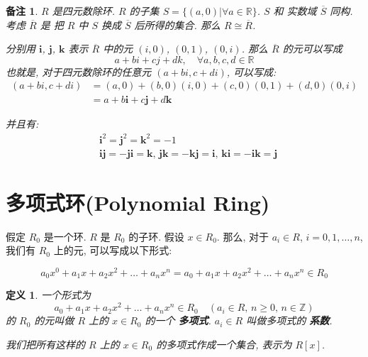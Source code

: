 \documentclass[utf8]{ctexbook}
\newtheorem{definition}{定义}[section]
\newtheorem{memo}{备注}[section]
\begin{document}
\begin{memo}
$R$ 是四元数除环. $R$ 的子集 $S = \{ (a, 0) | \forall a \in \mathbb{R} \}$. $S$ 和 实数域 $\overline{S}$ 同构. 考虑 $\overline{R}$ 是 把 $R$ 中 $S$ 换成 $\overline{S}$ 后所得的集合. 那么 $R \cong \overline{R}$. 

分别用 $\mathbf{i}$, $\mathbf{j}$, $\mathbf{k}$ 表示 $\overline{R}$ 中的元 $(i, 0)$, $(0, 1)$, $(0, i)$. 那么 $\overline{R}$ 的元可以写成
\begin{equation}
a + bi + cj + dk,\quad  \forall a, b, c, d \in \mathbb{R}
\end{equation}
也就是, 对于四元数除环的任意元 $(a+bi, c+di)$, 可以写成:
\begin{align*}
(a+bi, c+di) & = (a, 0) + (b,0)(i,0) + (c,0) (0,1) + (d,0)(0,i) \\
& = a + b \mathbf{i} + c \mathbf{j}+ d \mathbf{k}
\end{align*}


并且有:
\begin{align*}
& \mathbf{i}^2 = \mathbf{j}^2 = \mathbf{k}^2 = -1 \\
& \mathbf{i} \mathbf{j}  = - \mathbf{j} \mathbf{i}  = \mathbf{k},\, \mathbf{j}  \mathbf{k}  = -\mathbf{k}  \mathbf{j}  = \mathbf{i} ,\, \mathbf{k} \mathbf{i}  = - \mathbf{i}  \mathbf{k}  = \mathbf{j} 
\end{align*}

\end{memo}

\section{多项式环(Polynomial Ring)}

假定 $R_0$ 是一个环. $R$ 是 $R_0$ 的子环. 假设 $x \in R_0$. 那么, 对于 $a_i \in R$, $i =0, 1, \ldots, n$, 我们有 $R_0$ 上的元, 可以写成以下形式:
 
\begin{equation}
a_0 x^0 + a_1 x + a_2 x^2 + \ldots + a_n x^n = a_0 + a_1 x + a_2 x^2 + \ldots + a_n x^n \in R_0 \nonumber
\end{equation} 


\begin{definition}
一个形式为
\begin{equation}
a_0 + a_1 x + a_2 x^2 + \ldots + a_n x^n \in R_0 \quad (a_i \in R, \, n \geq 0, \, n \in \mathbb{Z} )
\end{equation} 
的 $R_0$ 的元叫做 $R$ 上的 $x \in R_0$ 的一个 \textbf{多项式}. $a_i \in R$ 叫做多项式的 \textbf{系数}.

我们把所有这样的 $R$ 上的 $x\in R_0$ 的多项式作成一个集合, 表示为 $R[x]$.

\end{definition}
\end{document}
